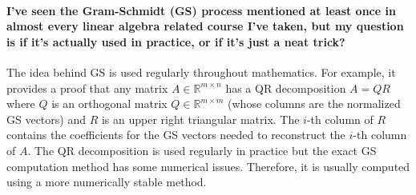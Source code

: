 \documentclass[10pt,english]{article}
\begin{document}
\paragraph{I've seen the Gram-Schmidt (GS) process mentioned at least once in almost every linear algebra related course I've taken, but my question is if it's actually used in practice, or if it's just a neat trick?}

The idea behind GS is used regularly throughout mathematics.
For example, it provides a proof that any matrix $A \in \mathbb{R}^{m\times n}$ has a QR decomposition $A=QR$ where $Q$ is an orthogonal matrix $Q\in \mathbb{R}^{m\times m}$ (whose columns are the normalized GS vectors) and $R$ is an upper right triangular matrix.
The $i$-th column of $R$ contains the coefficients for the GS vectors needed to reconstruct the $i$-th column of $A$.
The QR decomposition is used regularly in practice but the exact GS computation method has some numerical issues.
Therefore, it is usually computed using a more numerically stable method.
\end{document}
